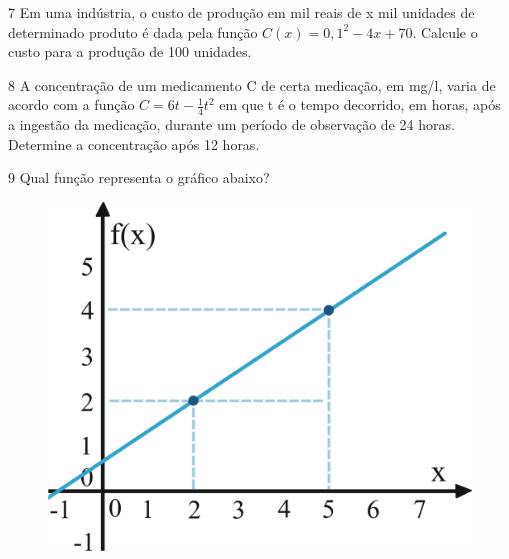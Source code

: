 \num{7} Em uma indústria, o custo de produção em mil reais de x mil unidades
de determinado produto é dada pela função $ C(x) = 0,1^2 - 4x + 70$. Calcule 
o custo para a produção de 100 unidades.
\enlargethispage{2\baselineskip}



\num{8} A concentração de um medicamento C de certa medicação, em mg/l, varia de
acordo com a função $C = 6t - \frac{1}{4} t^2$ em que t é o tempo decorrido, em 
horas, após a ingestão da medicação, durante um período de observação de 24 horas.
Determine a concentração após 12 horas.

\begin{emptybox}
\end{emptybox}

\num{9} Qual função representa o gráfico abaixo?

\begin{figure}[htpb!]
\centering
\includegraphics[width=.65\textwidth]{./ilustras-mat/modulo_9-atividade_9.png}
\end{figure}

\begin{emptybox}
\end{emptybox}

